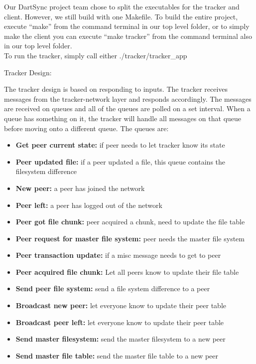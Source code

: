 

	Our DartSync project team chose to split the executables for the tracker and client.  However, we still build with one Makefile.  To build the entire project, execute ``make'' from the command terminal in our top level folder, or to simply make the client you can execute ``make tracker'' from the command terminal also in our top level folder.  \\

	To run the tracker, simply call either ./tracker/tracker_app
	
	Tracker Design:

The tracker design is based on responding to inputs. The tracker receives messages from the tracker-network layer and responds accordingly. The messages are received on queues and all of the queues are polled on a set interval. When a queue has something on it, the tracker will handle all messages on that queue before moving onto a different queue. The queues are:

\begin{itemize}
\item \textbf{Get peer current state:} if peer needs to let tracker know its state
\item \textbf{Peer updated file:} if a peer updated a file, this queue contains the filesystem difference
\item \textbf{New peer:} a peer has joined the network
\item \textbf{Peer left:} a peer has logged out of the network
\item \textbf{Peer got file chunk:} peer acquired a chunk, need to update the file table
\item \textbf{Peer request for master file system:} peer needs the master file system
\end{itemize}

\begin{itemize}
\item \textbf{Peer transaction update:} if a misc message needs to get to peer
\item \textbf{Peer acquired file chunk:} Let all peers know to update their file table
\item \textbf{Send peer file system:} send a file system difference to a peer
\item \textbf{Broadcast new peer:} let everyone know to update their peer table
\item \textbf{Broadcast peer left:} let everyone know to update their peer table
\item \textbf{Send master filesystem:} send the master filesystem to a new peer
\item \textbf{Send master file table:} send the master file table to a new peer
\end{itemize}

